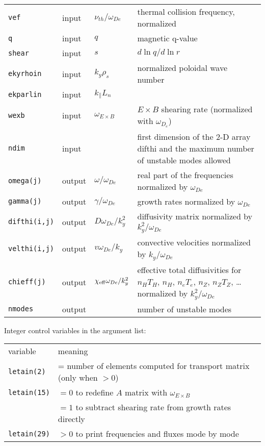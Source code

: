 \begin{center}
\begin{tabular}{lllp{3.0in}}
{\tt vef}       & input & $ \nu_{th} / \omega_{De} $ &
     thermal collision frequency, normalized \\
{\tt q}         & input & $ q $ & magnetic q-value \\
{\tt shear}     & input & $ s $ & $ d \ln q / d \ln r $ \\
{\tt ekyrhoin}  & input & $ k_y \rho_s $ & normalized poloidal
                    wave number \\
{\tt ekparlin}  & input & $k_\parallel L_n$ & \\
{\tt wexb}      & input & $\omega_{E\times B}$& $E\times B$ shearing rate
(normalized with $\omega_{D_e}$) \\
{\tt ndim} & input & & first dimension of the 2-D array difthi
               and the maximum number of unstable modes allowed \\
{\tt omega(j)}  & output & $\omega / \omega_{De} $ &
     real part of the frequencies normalized by $ \omega_{De} $ \\
{\tt gamma(j)}  & output & $\gamma / \omega_{De} $ &
     growth rates normalized by $ \omega_{De} $ \\
{\tt difthi(i,j)}      & output & $ D \omega_{De} / k_y^2 $
      & diffusivity matrix normalized by $ k_y^2 / \omega_{De} $ \\
{\tt velthi(i,j)}      & output & $ v \omega_{De} / k_y $
      & convective velocities normalized by $ k_y / \omega_{De} $ \\
{\tt chieff(j)} & output & $ \chi_{\rm eff} \omega_{De} / k_y^2 $
      & effective total diffusivities
        for $ n_H T_H $, $ n_H $, $ n_e T_e $,
        $ n_Z $, $ n_Z T_Z $, \ldots
        normalized by $ k_y^2 / \omega_{De} $ \\
{\tt nmodes} & output & & number of unstable modes \\

\end{tabular}
\end{center}

\newpage
\renewcommand{\arraystretch}{1.0}
\begin{center}
Integer control variables in the argument list:
\begin{tabular}{lp{4.0in}}
variable & meaning \\
{\tt letain(2)} & = number of elements computed for transport matrix
                    (only when $> 0$) \\
{\tt letain(15)} & $ = 0 $ to redefine $A$ matrix with $\omega_{E\times B}$ \\
                 & $ = 1 $ to subtract shearing rate from growth rates directly
\\
{\tt letain(29)} & $ > 0 $ to print frequencies and fluxes mode by mode \\

\end{tabular}
\end{center}

